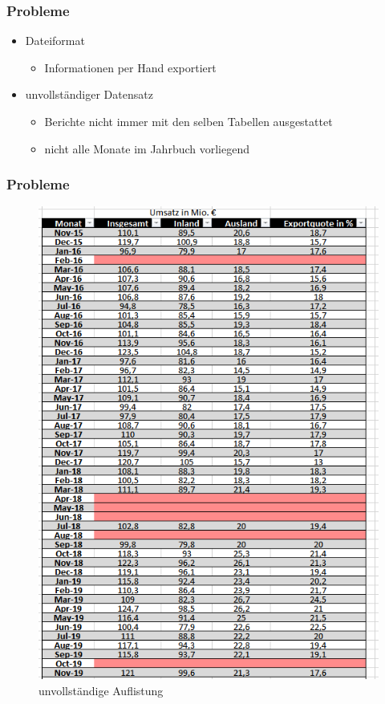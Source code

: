 \documentclass{beamer}
\begin{document}
\begin{frame}
	\frametitle{Probleme}
	\begin{itemize}
		\item Dateiformat
			\begin{itemize}
				\item Informationen per Hand exportiert
			\end{itemize}
		\item unvollständiger Datensatz
			\begin{itemize}
				\item Berichte nicht immer mit den selben Tabellen ausgestattet
				\item nicht alle Monate im Jahrbuch vorliegend
			\end{itemize}
	\end{itemize}
\end{frame}

\begin{frame}
	\frametitle{Probleme}
	\begin{figure}[h]
		\caption{unvollständige Auflistung}
		\centering
		\includegraphics[scale=0.3]{4_Monatsberichte_unvoll}
	\end{figure}
\end{frame}
\end{document}
